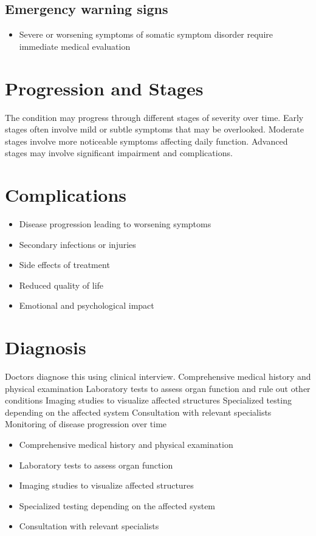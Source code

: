 \subsection{Emergency warning signs}
\begin{itemize}[noitemsep]
  \item Severe or worsening symptoms of somatic symptom disorder require immediate medical evaluation
\end{itemize}
\section{Progression and Stages}
The condition may progress through different stages of severity over time. Early stages often involve mild or subtle symptoms that may be overlooked. Moderate stages involve more noticeable symptoms affecting daily function. Advanced stages may involve significant impairment and complications.
\section{Complications}
\begin{itemize}[noitemsep]
  \item Disease progression leading to worsening symptoms
  \item Secondary infections or injuries
  \item Side effects of treatment
  \item Reduced quality of life
  \item Emotional and psychological impact
\end{itemize}
\section{Diagnosis}
Doctors diagnose this using clinical interview. Comprehensive medical history and physical examination Laboratory tests to assess organ function and rule out other conditions Imaging studies to visualize affected structures Specialized testing depending on the affected system Consultation with relevant specialists Monitoring of disease progression over time

\begin{itemize}[noitemsep]
  \item Comprehensive medical history and physical examination
  \item Laboratory tests to assess organ function
  \item Imaging studies to visualize affected structures
  \item Specialized testing depending on the affected system
  \item Consultation with relevant specialists
\end{itemize}
